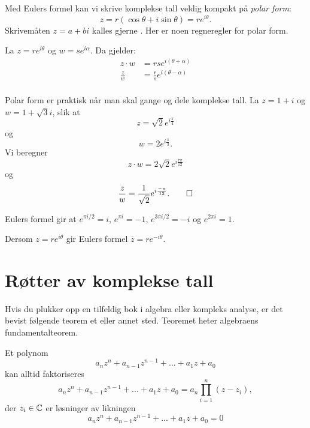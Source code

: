 Med Eulers formel kan vi skrive komplekse tall veldig kompakt på \emph{polar form}:
\[
z=r(\cos \theta+i\sin \theta)=re^{i\theta}.
\]
Skrivemåten $z=a+bi$ kalles gjerne .
Her er noen regneregler for polar form.
\begin{tcolorbox}
\begin{thm}
La $z=re^{i\theta}$ og $w=se^{i\alpha}$. Da gjelder:
\begin{align*}
z \cdot w&=rs e^{i(\theta + \alpha)} \\[6pt]
\frac{z}{w}&=\frac{r}{s} e^{i(\theta - \alpha)} \\
\end{align*}
\end{thm}
\vspace{1mm}
\end{tcolorbox}

\begin{ex}
Polar form er praktisk når man skal gange og dele komplekse tall. 
La $z=1+i$ og $w=1+\sqrt{3}i$, slik at
\[
z=\sqrt{2}e^{i\frac{\pi}{4}}
\]
og 
\[
w=2e^{i\frac{\pi}{3}}.
\]
Vi beregner
\[
z\cdot w=2\sqrt{2}e^{i\frac{7\pi}{12}}
\]
og
\[
\frac{z}{w}=\frac{1}{\sqrt{2}}e^{i\frac{-\pi}{12}}. \qedhere
\]
\end{ex}

\begin{ex}
Eulers formel gir at $e^{ \pi i/2 }=i$, $e^{\pi i}=-1$, $e^{3\pi i/2 }=-i$ og $e^{2 \pi i}=1$.
\end{ex}

\begin{ex}
Dersom $z=re^{i\theta}$ gir Eulers formel $\overline z=re^{-i\theta}$.
\end{ex}

\section*{Røtter av komplekse tall}
Hvis du plukker opp en tilfeldig bok i algebra eller kompleks analyse, 
er det bevist følgende teorem et eller annet sted. 
Teoremet heter algebraens fundamentalteorem.
\begin{tcolorbox}
\begin{thm}
Et polynom
\[
a_nz^n+a_{n-1}z^{n-1}+...+a_1z+a_0
\]
kan alltid faktoriseres
\[
a_nz^n+a_{n-1}z^{n-1}+...+a_1z+a_0=a_n \prod_{i=1}^n (z-z_i),
\]
der $z_i \in \mathbb{C}$ er løsninger av likningen
\[
a_nz^n+a_{n-1}z^{n-1}+...+a_1z+a_0=0
\]
\end{thm}
\vspace{1mm}
\end{tcolorbox}

